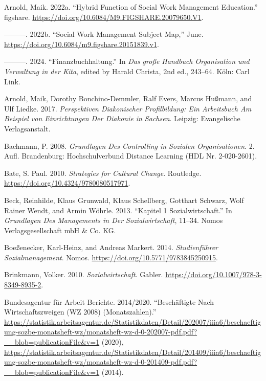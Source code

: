 \documentclass[
  letterpaper,
]{book}
\newlength{\cslhangindent}
\newenvironment{CSLReferences}[2] %
 {\begin{list}{}{%
  \setlength{\itemindent}{0pt}
  \setlength{\leftmargin}{0pt}
  \setlength{\parsep}{0pt}
  \ifodd #1
   \setlength{\leftmargin}{\cslhangindent}
   \setlength{\itemindent}{-1\cslhangindent}
  \fi
  \setlength{\itemsep}{#2\baselineskip}}}
 {\end{list}}
\begin{document}
\label{refs}
\begin{CSLReferences}{1}{0}
Arnold, Maik. 2022a. {``Hybrid Function of Social Work Management
Education.''} figshare.
\url{https://doi.org/10.6084/M9.FIGSHARE.20079650.V1}.

---------. 2022b. {``{Social Work Management Subject Map},''} June.
\url{https://doi.org/10.6084/m9.figshare.20151839.v1}.

---------. 2024. {``Finanzbuchhaltung.''} In \emph{Das große Handbuch
Organisation und Verwaltung in der Kita}, edited by Harald Christa, 2nd
ed., 243--64. Köln: Carl Link.

Arnold, Maik, Dorothy Bonchino-Demmler, Ralf Evers, Marcus Hußmann, and
Ulf Liedke. 2017. \emph{Perspektiven Diakonischer Profilbildung: Ein
Arbeitsbuch Am Beispiel von Einrichtungen Der Diakonie in Sachsen}.
Leipzig: Evangelische Verlagsanstalt.

Bachmann, P. 2008. \emph{Grundlagen Des Controlling in Sozialen
Organisationen}. 2. Aufl. Brandenburg: Hochschulverbund Distance
Learning (HDL Nr. 2-020-2601).

Bate, S. Paul. 2010. \emph{Strategies for Cultural Change}. Routledge.
\url{https://doi.org/10.4324/9780080517971}.

Beck, Reinhilde, Klaus Grunwald, Klaus Schellberg, Gotthart Schwarz,
Wolf Rainer Wendt, and Armin Wöhrle. 2013. {``Kapitel 1
Sozialwirtschaft.''} In \emph{Grundlagen Des Managements in Der
Sozialwirtschaft}, 11--34. Nomos Verlagsgesellschaft mbH \& Co. KG.

Boeßenecker, Karl-Heinz, and Andreas Markert. 2014. \emph{Studienführer
Sozialmanagement}. Nomos. \url{https://doi.org/10.5771/9783845250915}.

Brinkmann, Volker. 2010. \emph{Sozialwirtschaft}. Gabler.
\url{https://doi.org/10.1007/978-3-8349-8935-2}.

Bundesagentur für Arbeit Berichte. 2014/2020. {``Beschäftigte Nach
Wirtschaftszweigen (WZ 2008) (Monatszahlen).''}
\url{https://statistik.arbeitsagentur.de/Statistikdaten/Detail/202007/iiia6/beschaeftigung-sozbe-monatsheft-wz/monatsheft-wz-d-0-202007-pdf.pdf?__blob=publicationFile&v=1}
(2020),
\url{https://statistik.arbeitsagentur.de/Statistikdaten/Detail/201409/iiia6/beschaeftigung-sozbe-monatsheft-wz/monatsheft-wz-d-0-201409-pdf.pdf?__blob=publicationFile&v=1}
(2014).


\end{CSLReferences}
\end{document}
